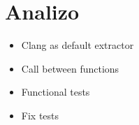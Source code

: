 \section{Analizo} %
\label{sec:analizo}

\begin{frame}
    \begin{itemize} 
        \item Clang as default extractor
        \item Call between functions   
        \item Functional tests
        \item Fix tests
    \end{itemize}
\end{frame}
